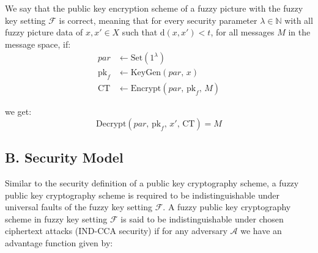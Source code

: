 \documentclass[graybox]{svmult}
\begin{document}
We say that the public key encryption scheme of a fuzzy picture with the fuzzy key setting \( \mathcal{F} \) is correct, meaning that for every security parameter \( \lambda \in \mathbb{N} \) with all fuzzy picture data of \( x, x' \in X \) such that \( \mathrm{d}(x, x') < t \), for all messages \( M \) in the \allowbreak message space, if:
\begin{align*}
    par         & \leftarrow \text{Set}(1^\lambda)                    \\[6pt]
    \text{pk}_f & \leftarrow \text{KeyGen}(par ,\, x)                 \\[6pt]
    \text{CT}   & \leftarrow \text{Encrypt}(par ,\, \text{pk}_f,\, M)
\end{align*}

we get:
\[
    \text{Decrypt}(par ,\, \text{pk}_f,\, x',\, \text{CT}) = M
\]

\subsection*{B. Security Model}

Similar to the security definition of a public key cryptography scheme, a fuzzy public key cryptography scheme is required to be indistinguishable under universal faults of the fuzzy key setting \( \mathcal{F} \).
A fuzzy public key cryptography scheme in fuzzy key setting \( \mathcal{F} \) is said to be indistinguishable under chosen ciphertext attacks (IND-CCA security) if for any adversary \( \mathcal{A} \) we have an advantage function given by:
\end{document}
